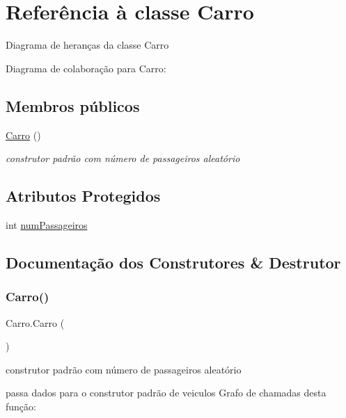 \hypertarget{class_carro}{}\section{Referência à classe Carro}
\label{class_carro}


Diagrama de heranças da classe Carro


Diagrama de colaboração para Carro\+:
\subsection*{Membros públicos}
\begin{DoxyCompactItemize}
\item 
\mbox{\hyperlink{class_carro_a853f79365b5c36491d34cf8f3815f75e}{Carro}} ()
\begin{DoxyCompactList}\small\item\em construtor padrão com número de passageiros aleatório \end{DoxyCompactList}\end{DoxyCompactItemize}
\subsection*{Atributos Protegidos}
\begin{DoxyCompactItemize}
\item 
int \mbox{\hyperlink{class_carro_a078d618deb133f1bd65f421c10c77507}{num\+Passageiros}}
\end{DoxyCompactItemize}


\subsection{Documentação dos Construtores \& Destrutor}
\mbox{\label{class_carro_a853f79365b5c36491d34cf8f3815f75e}} 
\subsubsection{\texorpdfstring{Carro()}{Carro()}}
{\footnotesize\ttfamily Carro.\+Carro (\begin{DoxyParamCaption}{ }\end{DoxyParamCaption})}



construtor padrão com número de passageiros aleatório 

passa dados para o construtor padrão de veiculos Grafo de chamadas desta função\+:



